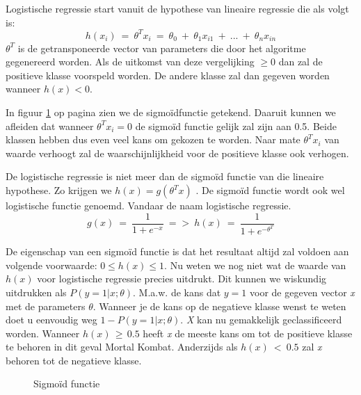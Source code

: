 Logistische regressie start vanuit de hypothese van lineaire regressie die als volgt is: 
$$
h(x_{i}) \:= \: \theta^{T}x_{i} \:=\: \theta_{0} \:+ \:\theta_{1}x_{i1} \:+ \: ...\: + \: \theta_{n}x_{in}
$$
$ \theta^{T}$ is de getransponeerde vector van parameters die door het algoritme gegenereerd worden. Als de uitkomst van deze vergelijking $\geq 0$ dan zal de positieve klasse voorspeld worden. De andere klasse zal dan gegeven worden wanneer $h(x) < 0$. 

In figuur \ref{fig:sigmoid-functie} op pagina \pageref{fig:sigmoid-functie} zien we de sigmoïdfunctie getekend.  Daaruit kunnen we afleiden dat wanneer  $\theta^{T}x_{i} = 0$ de sigmoïd functie gelijk zal zijn aan 0.5. Beide klassen hebben dus even veel kans om gekozen te worden. Naar mate  $\theta^{T}x_{i}$ van waarde verhoogt zal de waarschijnlijkheid voor de positieve klasse ook verhogen. 

De logistische regressie is niet meer dan de sigmoïd functie van die lineaire hypothese. Zo krijgen we $h(x) = g(\theta^{T}x)$ . De sigmoïd functie wordt ook wel logistische functie genoemd. Vandaar de naam logistische regressie. 
$$
g(x) \: = \: {\frac{1}{1+e^{-x}}} \: => \: h(x) \: = \:{\frac{1}{1+e^{-\theta^{T} }}}
$$

De eigenschap van een sigmoïd functie is dat het resultaat altijd zal voldoen aan volgende voorwaarde: $ 0 \leq h(x) \leq1$. 
Nu weten we nog niet wat de waarde van $h(x)$ voor logistische regressie precies uitdrukt. Dit kunnen we wiskundig uitdrukken als $P(y=1|x;\theta)$. M.a.w. de kans dat $y = 1$ voor de gegeven vector \textit{x} met de parameters $\theta$. Wanneer je de kans op de negatieve klasse wenst te weten doet u eenvoudig weg $1 - P(y=1|x;\theta)$. 
\textit{X} kan nu gemakkelijk geclassificeerd worden. Wanneer $h(x)\,\geq\,0.5$ heeft \textit{x} de meeste kans om tot de positieve klasse te behoren in dit geval Mortal Kombat. Anderzijds als $h(x)\:<\:0.5$ zal \textit{x} behoren tot de negatieve klasse. 

\begin{figure}
	\centering
	\caption{Sigmoïd functie}
	\label{fig:sigmoid-functie}
\end{figure}
 

